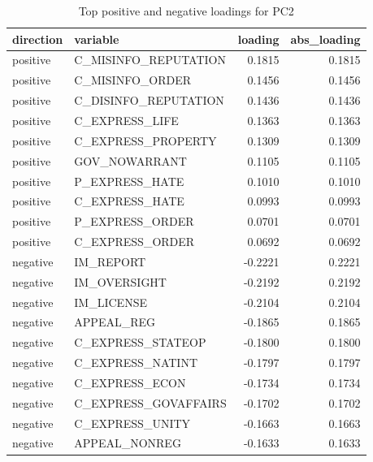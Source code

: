 \begin{table}
\caption{Top positive and negative loadings for PC2}
\label{tab:pc2_loadings}
\begin{tabular}{llrr}
\toprule
direction & variable & loading & abs_loading \\
\midrule
positive & C_MISINFO_REPUTATION & 0.1815 & 0.1815 \\
positive & C_MISINFO_ORDER & 0.1456 & 0.1456 \\
positive & C_DISINFO_REPUTATION & 0.1436 & 0.1436 \\
positive & C_EXPRESS_LIFE & 0.1363 & 0.1363 \\
positive & C_EXPRESS_PROPERTY & 0.1309 & 0.1309 \\
positive & GOV_NOWARRANT & 0.1105 & 0.1105 \\
positive & P_EXPRESS_HATE & 0.1010 & 0.1010 \\
positive & C_EXPRESS_HATE & 0.0993 & 0.0993 \\
positive & P_EXPRESS_ORDER & 0.0701 & 0.0701 \\
positive & C_EXPRESS_ORDER & 0.0692 & 0.0692 \\
negative & IM_REPORT & -0.2221 & 0.2221 \\
negative & IM_OVERSIGHT & -0.2192 & 0.2192 \\
negative & IM_LICENSE & -0.2104 & 0.2104 \\
negative & APPEAL_REG & -0.1865 & 0.1865 \\
negative & C_EXPRESS_STATEOP & -0.1800 & 0.1800 \\
negative & C_EXPRESS_NATINT & -0.1797 & 0.1797 \\
negative & C_EXPRESS_ECON & -0.1734 & 0.1734 \\
negative & C_EXPRESS_GOVAFFAIRS & -0.1702 & 0.1702 \\
negative & C_EXPRESS_UNITY & -0.1663 & 0.1663 \\
negative & APPEAL_NONREG & -0.1633 & 0.1633 \\
\bottomrule
\end{tabular}
\end{table}
